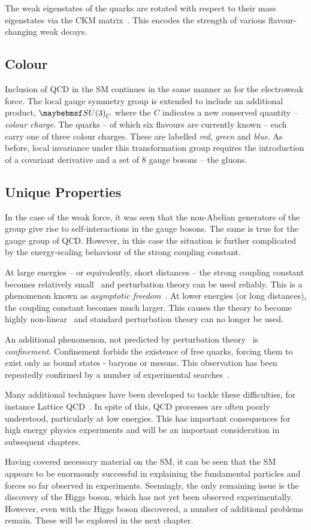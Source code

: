 The weak eigenstates of the quarks are rotated with respect to their mass
eigenstates via the \acl{CKM} matrix~\cite{cabbibo,kobayashi_maskawa}. This encodes the strength of various
flavour-changing weak decays.

\subsection{Colour}
Inclusion of \ac{QCD} in the \ac{SM} continues in the same manner as for the
electroweak force. The local gauge symmetry group is extended to include an
additional product, $\SUthree_{C}$ where the $C$ indicates a new conserved
quantity -- \emph{colour charge}. The quarks -- of which six flavours are
currently known -- each carry one of three colour charges. These are labelled
\emph{red}, \emph{green} and \emph{blue}. As before, local invariance under this
transformation group requires the introduction of a covariant derivative and a
set of 8 gauge bosons -- the gluons.

\subsection{Unique Properties}
In the case of the weak force, it was seen that the non-Abelian generators of
the \SUtwo group give rise to self-interactions in the gauge bosons. The same is
true for the \SUthree gauge group of \ac{QCD}. However, in this case the
situation is further complicated by the energy-scaling behaviour of the strong
coupling constant.

At large energies -- or equivalently, short distances -- the strong coupling
constant becomes relatively small~\cite{lattice_qcd} and perturbation theory can
be used reliably. This is a phenomenon known as \emph{asymptotic
  freedom}~\cite{asymptotic_freedom}. At lower energies (or long distances), the
coupling constant becomes much larger. This causes the theory to become highly
non-linear~\cite{lattice_qcd2} and standard perturbation theory can no longer be
used.

An additional phenomenon, not predicted by perturbation
theory~\cite{perturbative_qcd_handbook} is \emph{confinement}. Confinement
forbids the existence of free quarks, forcing them to exist only as bound states
- baryons or mesons. This observation has been repeatedly confirmed by a number
of experimental searches~\cite[p.~30]{pdg}.

Many additional techniques have been developed to tackle these difficulties, for
instance Lattice \ac{QCD}~\cite{lattice_qcd}. In spite of this, \ac{QCD}
processes are often poorly understood, particularly at low energies. This has
important consequences for high energy physics experiments and will be an
important consideration in subsequent chapters.

Having covered necessary material on the \ac{SM}, it can be seen that the
\ac{SM} appears to be enormously successful in explaining the fundamental
particles and forces so far observed in experiments. Seemingly, the only
remaining issue is the discovery of the Higgs boson, which has not yet been
observed experimentally. However, even with the Higgs boson discovered, a number
of additional problems remain. These will be explored in the next chapter.
